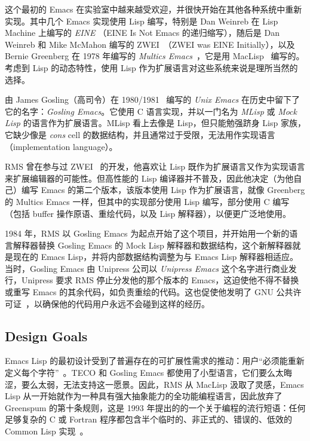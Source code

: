 \documentclass[format=acmsmall,screen]{acmart}
\begin{document}
这个最初的 Emacs 在实验室中越来越受欢迎，并很快开始在其他各种系统中重新实现。其中几个 Emacs 实现使用 Lisp 编写，特别是 Dan Weinreb 在 Lisp Machine 上编写的 \emph{EINE} （EINE Is Not Emacs 的递归缩写），随后是 Dan Weinreb 和 Mike McMahon 编写的 ZWEI~\cite{Weinreb1979}（ZWEI was EINE Initially），以及 Bernie Greenberg 在 1978 年编写的 \emph{Multics Emacs}~\cite{MulticsEmacs1996,Stallman2002}，它是用 MacLisp~\cite{Moon1974,Pitman1983} 编写的。考虑到 Lisp 的动态特性，使用 Lisp 作为扩展语言对这些系统来说是理所当然的选择。

由 James Gosling（高司令）在 1980/1981~\cite{Gosling1981} 编写的 \emph{Unix Emacs} 在历史中留下了它的名字：\emph{Gosling Emacs}。它使用 C 语言实现，并以一门名为 \emph{MLisp} 或 \emph{Mock Lisp} 的语言作为扩展语言。MLisp 看上去像是 Lisp，但只能勉强跻身 Lisp 家族，它缺少像是 \emph{cons} cell 的数据结构，并且通常过于受限，无法用作实现语言（implementation language）。

RMS 曾在参与过 ZWEI~\cite{Stallman2018-personal} 的开发，他喜欢让 Lisp 既作为扩展语言又作为实现语言来扩展编辑器的可能性。但高性能的 Lisp 编译器并不普及，因此他决定（为他自己）编写 Emacs 的第二个版本，该版本使用 Lisp 作为扩展语言，就像 Greenberg 的 Multics Emacs 一样，但其中的实现部分使用 Lisp 编写，部分使用 C 编写（包括 buffer 操作原语、重绘代码，以及 Lisp 解释器），以便更广泛地使用。

1984 年，RMS 以 Gosling Emacs 为起点开始了这个项目，并开始用一个新的语言解释器替换 Gosling Emacs 的 Mock Lisp 解释器和数据结构，这个新解释器就是现在的 Emacs Lisp，并将内部数据结构调整为与 Emacs Lisp 解释器相适应。当时，Gosling Emacs 由 Unipress 公司以 \emph{Unipress Emacs} 这个名字进行商业发行，Unipress 要求 RMS 停止分发他的那个版本的 Emacs，这迫使他不得不替换或重写 Emacs 的其余代码，如负责重绘的代码。这也促使他发明了 GNU 公共许可证~\cite{GPLHistory}，以确保他的代码用户永远不会碰到这样的经历。

\subsection{Design Goals}

Emacs Lisp 的最初设计受到了普遍存在的可扩展性需求的推动：用户“必须能重新定义每个字符”~\cite{Stallman1981}。TECO 和 Gosling Emacs 都使用了小型语言，它们要么太晦涩，要么太弱，无法支持这一愿景。因此，RMS 从 MacLisp 汲取了灵感，Emacs Lisp 从一开始就作为一种具有强大抽象能力的全功能编程语言，因此放弃了 Greenspum 的第十条规则，这是 1993 年提出的的一个关于编程的流行短语：任何足够复杂的 C 或 Fortran 程序都包含半个临时的、非正式的、错误的、低效的 Common Lisp 实现~\cite{GreenspunsRule}。
\end{document}
